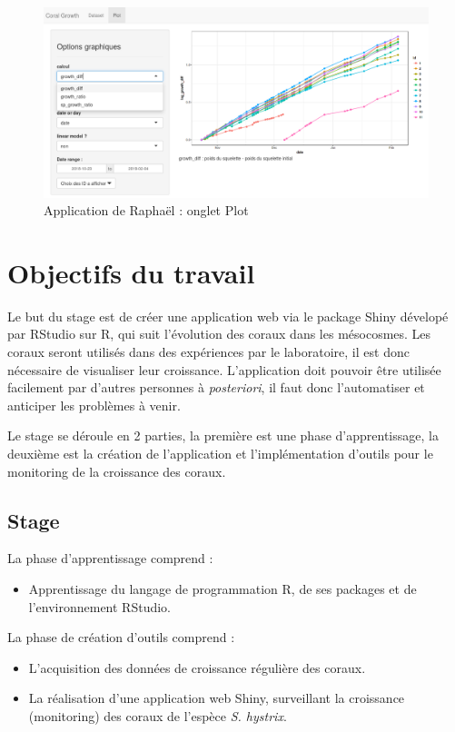\documentclass[]{report}
\providecommand{\tightlist}{%
  \setlength{\itemsep}{0pt}\setlength{\parskip}{0pt}}
\begin{document}
\begin{figure}
\centering
\includegraphics{../image/raphael2.png}
\caption{Application de Raphaël : onglet Plot}
\end{figure}

\chapter{Objectifs du travail}\label{objectifs-du-travail}

Le but du stage est de créer une application web via le package Shiny
dévelopé par RStudio sur R, qui suit l'évolution des coraux dans les
mésocosmes. Les coraux seront utilisés dans des expériences par le
laboratoire, il est donc nécessaire de visualiser leur croissance.
L'application doit pouvoir être utilisée facilement par d'autres
personnes à \emph{posteriori}, il faut donc l'automatiser et anticiper
les problèmes à venir.

Le stage se déroule en 2 parties, la première est une phase
d'apprentissage, la deuxième est la création de l'application et
l'implémentation d'outils pour le monitoring de la croissance des
coraux.

\section{Stage}\label{stage}

La phase d'apprentissage comprend :

\begin{itemize}
\tightlist
\item
  Apprentissage du langage de programmation R, de ses packages et de
  l'environnement RStudio.
\end{itemize}

La phase de création d'outils comprend :

\begin{itemize}
\item
  L'acquisition des données de croissance régulière des coraux.
\item
  La réalisation d'une application web Shiny, surveillant la croissance
  (monitoring) des coraux de l'espèce \emph{S. hystrix}.
\end{itemize}
\end{document}
